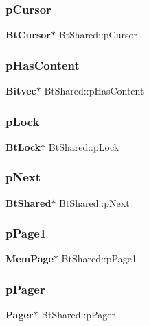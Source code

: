 \subsubsection{pCursor}
{\footnotesize\ttfamily \textbf{ Bt\+Cursor}$\ast$ Bt\+Shared\+::p\+Cursor}

\mbox{\label{struct_bt_shared_ace6191dc3f48f9575d7946ab8cf5b919}} 
\subsubsection{pHasContent}
{\footnotesize\ttfamily \textbf{ Bitvec}$\ast$ Bt\+Shared\+::p\+Has\+Content}

\mbox{\label{struct_bt_shared_af58c79eec88f99ed5a07d8cabf8a1d1a}} 
\subsubsection{pLock}
{\footnotesize\ttfamily \textbf{ Bt\+Lock}$\ast$ Bt\+Shared\+::p\+Lock}

\mbox{\label{struct_bt_shared_aaa9dd5c5d4ec2bb79ebe4b37ee926ae3}} 
\subsubsection{pNext}
{\footnotesize\ttfamily \textbf{ Bt\+Shared}$\ast$ Bt\+Shared\+::p\+Next}

\mbox{\label{struct_bt_shared_a296dffd1c698ec175fee109718f32d5d}} 
\subsubsection{pPage1}
{\footnotesize\ttfamily \textbf{ Mem\+Page}$\ast$ Bt\+Shared\+::p\+Page1}

\mbox{\label{struct_bt_shared_ab79703fc47a16446274457588d7eb989}} 
\subsubsection{pPager}
{\footnotesize\ttfamily \textbf{ Pager}$\ast$ Bt\+Shared\+::p\+Pager}

\mbox{\label{struct_bt_shared_aea3ccb6775c768fbd4f3e29df8cb925d}} 
